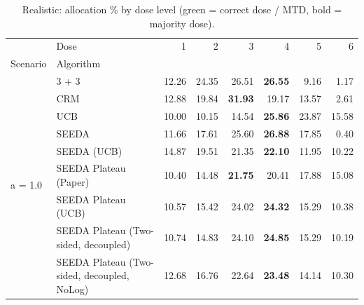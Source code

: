 \begin{table}[H]
\centering
\caption{Realistic: allocation \% by dose level (green = correct dose / MTD, bold = majority dose).}
\label{tab:real_alloc_by_dose}
\begin{tabular}{llrrrrrr}
\toprule
 & Dose & 1 & 2 & 3 & 4 & 5 & 6 \\
Scenario & Algorithm &  &  &  &  &  &  \\
\midrule
\multirow[c]{9}{*}{a = 1.0} & 3 + 3 & 12.26 & 24.35 & {\cellcolor[HTML]{C8E6C9}} 26.51 & \bfseries 26.55 & 9.16 & 1.17 \\
 & CRM & 12.88 & 19.84 & {\cellcolor[HTML]{C8E6C9}} \bfseries 31.93 & 19.17 & 13.57 & 2.61 \\
 & UCB & 10.00 & 10.15 & {\cellcolor[HTML]{C8E6C9}} 14.54 & \bfseries 25.86 & 23.87 & 15.58 \\
 & SEEDA & 11.66 & 17.61 & {\cellcolor[HTML]{C8E6C9}} 25.60 & \bfseries 26.88 & 17.85 & 0.40 \\
 & SEEDA (UCB) & 14.87 & 19.51 & {\cellcolor[HTML]{C8E6C9}} 21.35 & \bfseries 22.10 & 11.95 & 10.22 \\
 & SEEDA Plateau (Paper) & 10.40 & 14.48 & {\cellcolor[HTML]{C8E6C9}} \bfseries 21.75 & 20.41 & 17.88 & 15.08 \\
 & SEEDA Plateau (UCB) & 10.57 & 15.42 & {\cellcolor[HTML]{C8E6C9}} 24.02 & \bfseries 24.32 & 15.29 & 10.38 \\
 & SEEDA Plateau (Two-sided, decoupled) & 10.74 & 14.83 & {\cellcolor[HTML]{C8E6C9}} 24.10 & \bfseries 24.85 & 15.29 & 10.19 \\
 & SEEDA Plateau (Two-sided, decoupled, NoLog) & 12.68 & 16.76 & {\cellcolor[HTML]{C8E6C9}} 22.64 & \bfseries 23.48 & 14.14 & 10.30 \\
\bottomrule
\end{tabular}
\end{table}

